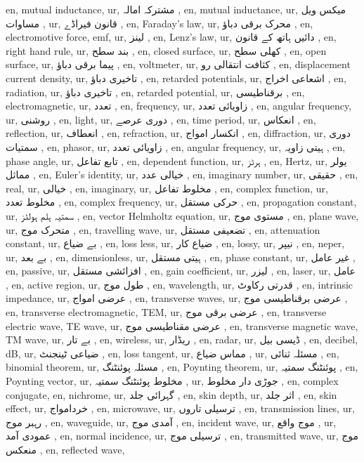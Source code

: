 en, mutual inductance,
ur, مشترکہ امالہ ,
en, mutual inductance,
ur, میکس ویل مساوات ,
ur, قانون فیراڈے ,
en, Faraday's law,
ur, محرک برقی دباؤ ,
en, electromotive force, emf,
ur, لینز ,
en, Lenz's law,
ur, دائیں ہاتھ کے قانون ,
en, right hand rule,
ur, بند سطح ,
en, closed surface,
ur, کھلی سطح ,
en, open surface,
ur, پیما برقی دباؤ ,
en, voltmeter,
ur, کثافت انتقالی رو ,
en, displacement current density,
ur, تاخیری دباؤ ,
en, retarded potentials,
ur, اشعاعی اخراج ,
en, radiation,
ur, تاخیری دباؤ ,
en, retarded potential,
ur, برقناطیسی ,
en, electromagnetic,
ur, تعدد ,
en, frequency,
ur, زاویائی تعدد ,
en, angular frequency,
ur, روشنی ,
en, light,
ur, دوری عرصے ,
en, time period,
ur, انعکاس ,
en, reflection,
ur, انعطاف ,
en, refraction,
ur, انکسار امواج ,
en, diffraction,
ur, دوری سمتیات ,
en, phasor,
ur, زاویائی تعدد ,
en, angular frequency,
ur, ہیتی زاویہ ,
en, phase angle,
ur, تابع تفاعل ,
en, dependent function,
ur, ہرٹز ,
en, Hertz,
ur, یولر مماثل ,
en, Euler's identity,
ur, خیالی عدد ,
en, imaginary number,
ur, حقیقی ,
en, real,
ur, خیالی ,
en, imaginary,
ur, مخلوط تفاعل ,
en, complex function,
ur, مخلوط تعدد ,
en, complex frequency,
ur, حرکی مستقل ,
en, propagation constant,
ur, سمتیہ ہلم ہولٹز ,
en, vector Helmholtz equation,
ur, مستوی موج ,
en, plane wave,
ur, متحرک موج ,
en, travelling wave,
ur, تضعیفی مستقل ,
en, attenuation constant,
ur, بے ضیاع ,
en, loss less,
ur, ضیاع کار ,
en, lossy,
ur, نیپر ,
en, neper,
ur, بے بعد ,
en, dimensionless,
ur, ہیتی مستقل ,
en, phase constant,
ur, غیر عامل ,
en, passive,
ur, افزائشی مستقل ,
en, gain coefficient,
ur, لیزر ,
en, laser,
ur, عامل ,
en, active region,
ur, طول موج ,
en, wavelength,
ur, قدرتی رکاوٹ ,
en, intrinsic impedance,
ur, عرضی امواج ,
en, transverse waves,
ur, عرضی برقناطیسی موج ,
en, transverse electromagnetic, TEM,
ur, عرضی برقی موج ,
en, transverse electric wave, TE wave,
ur, عرضی مقناطیسی موج ,
en, transverse magnetic wave, TM wave,
ur, بے تار ,
en, wireless,
ur, ریڈار ,
en, radar,
ur, ڈیسی بیل ,
en, decibel, dB,
ur, ضیاعی ٹینجنٹ ,
en, loss tangent,
ur, مماس ضیاع ,
ur, مسئلہ ثنائی ,
en, binomial theorem,
ur, مسئلہ پوئنٹنگ ,
en, Poynting theorem,
ur, پوئنٹنگ سمتیہ ,
en, Poynting vector,
ur, مخلوط پوئنٹنگ سمتیہ ,
ur, جوڑی دار مخلوط ,
en, complex conjugate,
en, nichrome,
ur, گہرائی جلد ,
en, skin depth,
ur, اثر جلد ,
en, skin effect,
ur, خردامواج ,
en, microwave,
ur, ترسیلی تاروں ,
en, transmission lines,
ur, رہبر موج ,
en, waveguide,
ur, آمدی موج ,
en, incident wave,
ur, موج واقع ,
ur, عمودی آمد ,
en, normal incidence,
ur, ترسیلی موج ,
en, transmitted wave,
ur, موج منعکس ,
en, reflected wave,
